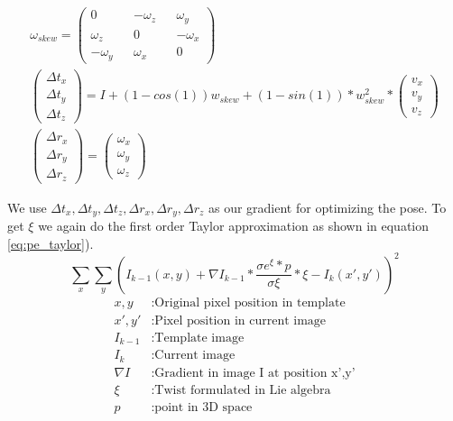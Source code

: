 \documentclass[11pt,a4paper,titlepage,oneside]{report}
\begin{document}
\begin{equation}\label{eq:pe_closed_form}
	\begin{gathered}
		\omega_{skew}=\begin{pmatrix}
			0 && -\omega_z && \omega_y \\
			\omega_z && 0 && -\omega_x \\
			-\omega_y && \omega_x && 0
		\end{pmatrix}\\
		\begin{pmatrix}
			\Delta t_x\\
			\Delta t_y\\
			\Delta t_z
		\end{pmatrix}=
		I+(1-cos(1))w_{skew}+(1-sin(1))*w_{skew}^2*\begin{pmatrix}
			v_x\\
			v_y\\
			v_z
		\end{pmatrix}\\
		\begin{pmatrix}
			\Delta r_x\\
			\Delta r_y\\
			\Delta r_z
		\end{pmatrix}=
		\begin{pmatrix}
			\omega_x\\
			\omega_y\\
			\omega_z
		\end{pmatrix}
	\end{gathered}
\end{equation}

We use $\Delta t_x,\Delta t_y,\Delta t_z,\Delta r_x,\Delta r_y,\Delta r_z$ as our gradient for optimizing the pose. To get $\xi$ we again do the first order Taylor approximation as shown in equation \ref{eq:pe_taylor}).
\begin{equation}\label{eq:pe_taylor}
	\sum_x\sum_y(I_{k-1}(x,y)+\nabla I_{k-1}*\frac{\sigma e^{\xi}*p}{\sigma \xi}*\xi-I_{k}(x',y'))^2
\end{equation}
\begin{align*}
	x,y				&: \text{Original pixel position in template}\\
	x',y'			&: \text{Pixel position in current image}\\
	I_{k-1}		&: \text{Template image}\\
	I_{k}			&: \text{Current image}\\
	\nabla I	&: \text{Gradient in image I at position x',y'}\\
	\xi				&: \text{Twist formulated in Lie algebra}\\
	p					&: \text{point in 3D space}  
\end{align*}
\end{document}
